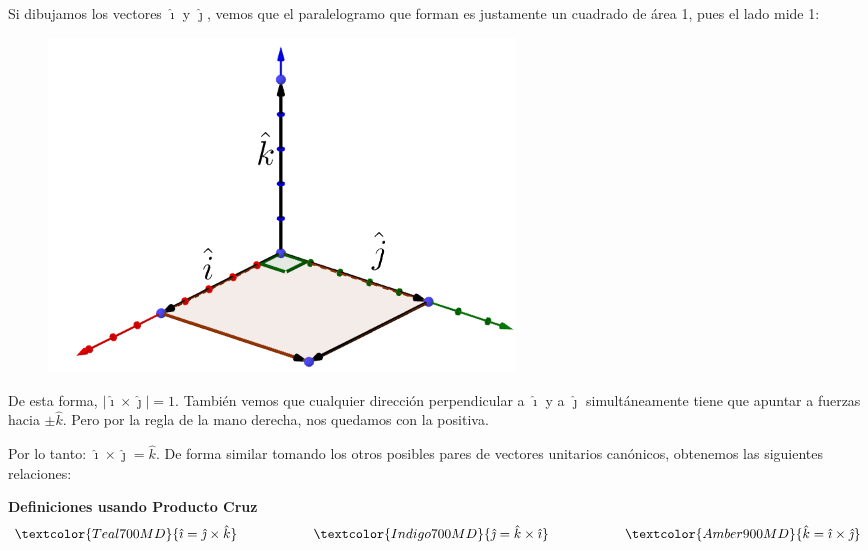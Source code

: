 \documentclass[12pt, fleqn]{report}                             %
\DeclareMathOperator \Space     {\quad}                         %
\DeclareMathOperator \MegaSpace {\quad \quad}                   %
\theoremstyle{break}                                            %
\newcommand{\hati}      {\hat{\imath}}                           %
\newcommand{\hatj}      {\hat{\jmath}}                           %
\newcommand{\hatk}      {\hat{k}}                                %
\newcommand{\abs}[1]    {\left\lvert #1 \right\lvert}           %
\begin{document}
                Si dibujamos los vectores $\hati$ y $\hatj$, vemos que el paralelogramo que
                forman es justamente un cuadrado de área 1, pues el lado mide 1:
                \begin{figure}[H]
                    \centering
                    \includegraphics[width=0.60\textwidth]{unitVectors}
                \end{figure}
            
                De esta forma, $\abs{\hati \times \hatj} = 1$. También vemos que cualquier
                dirección perpendicular a $\hati$ y a $\hatj$ simultáneamente tiene que apuntar
                a fuerzas hacia $\pm \hatk$. Pero por la regla de la mano derecha, nos quedamos con
                la positiva.

                Por lo tanto: $\hati \times \hatj = \hatk$. De forma similar tomando los otros
                posibles pares de vectores unitarios canónicos, obtenemos las siguientes relaciones:

                \vspace{1.5em}
                \textbf{Definiciones usando Producto Cruz}
                    \begin{align*}
                        \textcolor{Teal700MD}
                        {\hati = \hatj \times \hatk}
                            \MegaSpace \MegaSpace \Space
                        \textcolor{Indigo700MD}
                        {\hatj = \hatk \times \hati}
                            \MegaSpace \MegaSpace \Space
                        \textcolor{Amber900MD}
                        {\hatk = \hati \times \hatj}
                    \end{align*}
\end{document}
